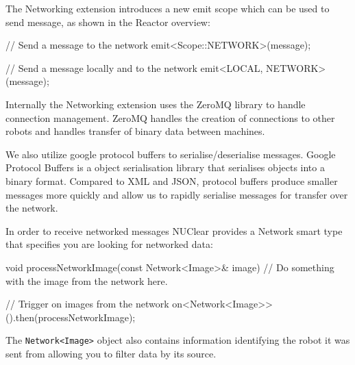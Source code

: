 \documentclass[english,12pt]{scrartcl}
\begin{document}
				The Networking extension introduces a new emit scope which can be used to send message, as shown in the Reactor overview:

				\begin{cppcode}
					// Send a message to the network
					emit<Scope::NETWORK>(message);

					// Send a message locally and to the network
					emit<LOCAL, NETWORK>(message);
				\end{cppcode}

				Internally the Networking extension uses the ZeroMQ library to handle connection management.
				ZeroMQ handles the creation of connections to other robots and handles transfer of binary data between machines.

				We also utilize google protocol buffers to serialise/deserialise messages.
				Google Protocol Buffers is a object serialisation library that serialises objects into a binary format.
				Compared to XML and JSON, protocol buffers produce smaller messages more quickly and allow us to rapidly serialise messages for transfer over the network.

				In order to receive networked messages NUClear provides a Network smart type that specifies you are looking for networked data:

				\begin{cppcode}
					void processNetworkImage(const Network<Image>& image) {
					    // Do something with the image from the network here.
					}

					// Trigger on images from the network
					on<Network<Image>>().then(processNetworkImage);
				\end{cppcode}

				The \texttt{Network<Image>} object also contains information identifying the robot it was sent from allowing you to filter data by its source.
\end{document}
